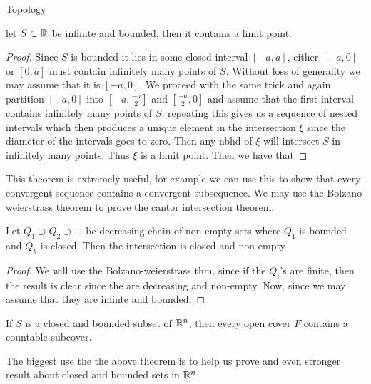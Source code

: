 \begin{chapter}{Topology}
    
    
    \begin{thm}
        let $S \subset \mathbb{R}$ be infinite and bounded, then it contains a limit point. 
    \end{thm}

    \begin{proof}
        Since $S$ is bounded it lies in some closed interval $[-a, a]$, either $[-a, 0]$ or $[0, a]$ must contain infinitely many points of $S$. 
        Without loss of generality we may assume that it is $[-a, 0]$. We proceed with the same trick and again partition $[-a, 0]$ into 
        $[-a, \frac{-a}{2}]$ and $[\frac{-a}{2}, 0]$ and assume that the first interval contains infinitely many points of $S$. 
        repeating this gives us a sequence of nested intervals which then produces a unique element in the intersection $\xi$ since the diameter of 
        the intervals goes to zero. Then any nbhd of $\xi$ will intersect $S$ in infinitely many points. Thus $\xi$ is a limit point. 
        Then we have that 
    \end{proof}

    This theorem is extremely useful, for example we can use this to show that every convergent sequence contains a convergent subsequence. 
    We may use the Bolzano-weierstrass theorem to prove the cantor intersection theorem. 

    
    \begin{thm}
        Let $Q_1 \supset Q_2 \supset \dots$ be decreasing chain of non-empty sets where $Q_1$ is bounded and $Q_k$ is closed. 
        Then the intersection is closed and non-empty
    \end{thm}

    \begin{proof}
        We will use the Bolzano-weierstrass thm, since if the $Q_i$'s are finite, then the result is clear since the are decreasing and non-empty. 
        Now, since we may assume that they are infinte and bounded, 
    \end{proof}

    \begin{thm}
        If $S$ is a closed and bounded subset of $\mathbb{R}^n$, then every open cover $F$ contains a countable subcover. 
    \end{thm}  

    The biggest use the the above theorem is to help us prove and even stronger result about closed and bounded sets in $\mathbb{R}^n$.


\end{chapter}
